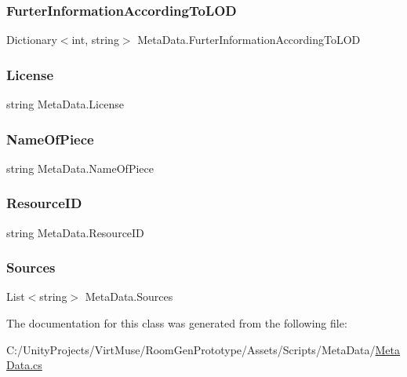 \subsubsection{\texorpdfstring{Furter\+Information\+According\+To\+L\+OD}{FurterInformationAccordingToLOD}}
{\footnotesize\ttfamily Dictionary$<$int, string$>$ Meta\+Data.\+Furter\+Information\+According\+To\+L\+OD}

\mbox{\label{class_meta_data_a43c021341f7ac2b2237041aae37bd3db}} 
\subsubsection{\texorpdfstring{License}{License}}
{\footnotesize\ttfamily string Meta\+Data.\+License}

\mbox{\label{class_meta_data_abb2ca2ab73300089a68d6c38f5610949}} 
\subsubsection{\texorpdfstring{Name\+Of\+Piece}{NameOfPiece}}
{\footnotesize\ttfamily string Meta\+Data.\+Name\+Of\+Piece}

\mbox{\label{class_meta_data_a1bbd18efe27fdbeb0ee920414caa12c8}} 
\subsubsection{\texorpdfstring{Resource\+ID}{ResourceID}}
{\footnotesize\ttfamily string Meta\+Data.\+Resource\+ID}

\mbox{\label{class_meta_data_acb76cf00c140a3da86a35ff350d0c05f}} 
\subsubsection{\texorpdfstring{Sources}{Sources}}
{\footnotesize\ttfamily List$<$string$>$ Meta\+Data.\+Sources}



The documentation for this class was generated from the following file\+:\begin{DoxyCompactItemize}
\item 
C\+:/\+Unity\+Projects/\+Virt\+Muse/\+Room\+Gen\+Prototype/\+Assets/\+Scripts/\+Meta\+Data/\mbox{\hyperlink{_meta_data_8cs}{Meta\+Data.\+cs}}\end{DoxyCompactItemize}
